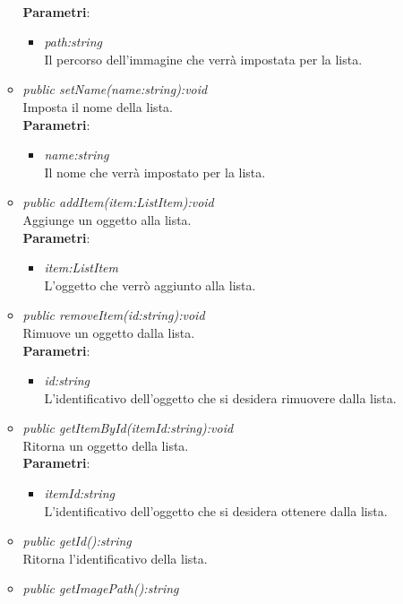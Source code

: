 \begin{itemize}
\begin{itemize}
				\\ \textbf{Parametri}: \begin{itemize}
				\item \textit{path:string}\\
				Il percorso dell'immagine che verrà impostata per la lista.
			\end{itemize} 
	\item \textit{public setName(name:string):void}\\
	Imposta il nome della lista.
				\\ \textbf{Parametri}: \begin{itemize}
				\item \textit{name:string}\\
				Il nome che verrà impostato per la lista.
			\end{itemize} 
	\item \textit{public addItem(item:ListItem):void}\\
	Aggiunge un oggetto alla lista.
				\\ \textbf{Parametri}: \begin{itemize}
				\item \textit{item:ListItem}\\
				L'oggetto che verrò aggiunto alla lista.
			\end{itemize} 
	\item \textit{public removeItem(id:string):void}\\
	Rimuove un oggetto dalla lista.
				\\ \textbf{Parametri}: \begin{itemize}
				\item \textit{id:string}\\
				L'identificativo dell'oggetto che si desidera rimuovere dalla lista.
			\end{itemize} 
	\item \textit{public getItemById(itemId:string):void}\\
	Ritorna un oggetto della lista.
				\\ \textbf{Parametri}: \begin{itemize}
				\item \textit{itemId:string}\\
				L'identificativo dell'oggetto che si desidera ottenere dalla lista.
			\end{itemize} 
	\item \textit{public getId():string}\\
	Ritorna l'identificativo della lista.
	\item \textit{public getImagePath():string}\\

\end{itemize}
\end{itemize}
